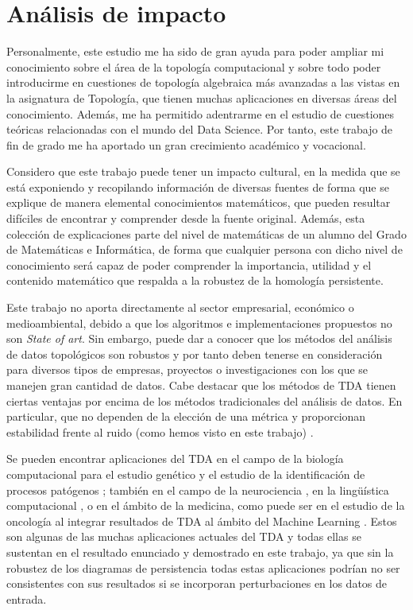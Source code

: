 \chapter{Análisis de impacto}

Personalmente, este estudio me ha sido de gran ayuda para poder ampliar mi conocimiento sobre el área de la topología computacional y sobre todo poder introducirme en cuestiones de topología algebraica más avanzadas a las vistas en la asignatura de Topología, que tienen muchas aplicaciones en diversas áreas del conocimiento. Además, me ha permitido adentrarme en el estudio de cuestiones teóricas relacionadas con el mundo del Data Science. Por tanto, este trabajo de fin de grado me ha aportado un gran crecimiento académico y vocacional.

Considero que este trabajo puede tener un impacto cultural, en la medida que se está exponiendo y recopilando información de diversas fuentes de forma que se explique de manera elemental conocimientos matemáticos, que pueden resultar difíciles de encontrar y comprender desde la fuente original. Además, esta colección de explicaciones parte del nivel de matemáticas de un alumno del Grado de Matemáticas e Informática, de forma que cualquier persona con dicho nivel de conocimiento será capaz de poder comprender la importancia, utilidad y el contenido matemático que respalda a la robustez de la homología persistente.

Este trabajo no aporta directamente al sector empresarial, económico o medioambiental, debido a que los algoritmos e implementaciones propuestos no son \emph{State of art}. Sin embargo, puede dar a conocer que los métodos del análisis de datos topológicos son robustos y por tanto deben tenerse en consideración para diversos tipos de empresas, proyectos o investigaciones con los que se manejen gran cantidad de datos. Cabe destacar que los métodos de TDA tienen ciertas ventajas por encima de los métodos tradicionales del análisis de datos. En particular, que no dependen de la elección de una métrica y proporcionan estabilidad frente al ruido (como hemos visto en este trabajo) \cite{tdaIBM}.  

Se pueden encontrar aplicaciones del TDA en el campo de la biología computacional para el estudio genético y el estudio de la identificación de procesos patógenos \cite{biologia}; también en el campo de la neurociencia \cite{neuronas}, en la lingüística computacional \cite{linguistica}, o en el ámbito de la medicina, como puede ser en el estudio de la oncología al integrar resultados de TDA al ámbito del Machine Learning \cite{oncologia}. Estos son algunas de las muchas aplicaciones actuales del TDA y todas ellas se sustentan en el resultado enunciado y demostrado en este trabajo, ya que sin la robustez de los diagramas de persistencia todas estas aplicaciones podrían no ser consistentes con sus resultados si se incorporan perturbaciones en los datos de entrada.